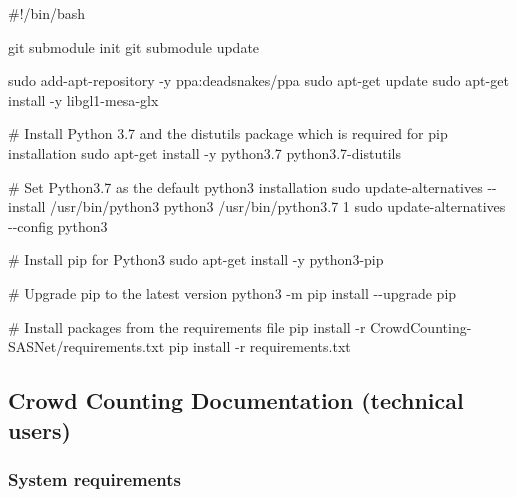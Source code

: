 \documentclass[
]{article}
\newenvironment{Shaded}{\begin{snugshade}}{\end{snugshade}}
\newcommand{\AttributeTok}[1]{\textcolor[rgb]{0.40,0.45,0.13}{#1}}
\newcommand{\CommentTok}[1]{\textcolor[rgb]{0.37,0.37,0.37}{#1}}
\newcommand{\ExtensionTok}[1]{\textcolor[rgb]{0.00,0.23,0.31}{#1}}
\newcommand{\FunctionTok}[1]{\textcolor[rgb]{0.28,0.35,0.67}{#1}}
\newcommand{\NormalTok}[1]{\textcolor[rgb]{0.00,0.23,0.31}{#1}}
\begin{document}
\begin{Shaded}
\begin{Highlighting}[]

\CommentTok{\#!/bin/bash}

\FunctionTok{git}\NormalTok{ submodule init}
\FunctionTok{git}\NormalTok{ submodule update}

\FunctionTok{sudo}\NormalTok{ add{-}apt{-}repository }\AttributeTok{{-}y}\NormalTok{ ppa:deadsnakes/ppa   }
\FunctionTok{sudo}\NormalTok{ apt{-}get update}
\FunctionTok{sudo}\NormalTok{ apt{-}get install }\AttributeTok{{-}y}\NormalTok{ libgl1{-}mesa{-}glx}

\CommentTok{\# Install Python 3.7 and the distutils package which is required for pip installation}
\FunctionTok{sudo}\NormalTok{ apt{-}get install }\AttributeTok{{-}y}\NormalTok{ python3.7 python3.7{-}distutils}

\CommentTok{\# Set Python3.7 as the default python3 installation}
\FunctionTok{sudo}\NormalTok{ update{-}alternatives }\AttributeTok{{-}{-}install}\NormalTok{ /usr/bin/python3 python3 /usr/bin/python3.7 1}
\FunctionTok{sudo}\NormalTok{ update{-}alternatives }\AttributeTok{{-}{-}config}\NormalTok{ python3}

\CommentTok{\# Install pip for Python3}
\FunctionTok{sudo}\NormalTok{ apt{-}get install }\AttributeTok{{-}y}\NormalTok{ python3{-}pip}

\CommentTok{\# Upgrade pip to the latest version}
\ExtensionTok{python3} \AttributeTok{{-}m}\NormalTok{ pip install }\AttributeTok{{-}{-}upgrade}\NormalTok{ pip}

\CommentTok{\# Install packages from the requirements file}
\ExtensionTok{pip}\NormalTok{ install }\AttributeTok{{-}r}\NormalTok{ CrowdCounting{-}SASNet/requirements.txt}
\ExtensionTok{pip}\NormalTok{ install }\AttributeTok{{-}r}\NormalTok{ requirements.txt}
\end{Highlighting}
\end{Shaded}

\hypertarget{crowd-counting-documentation-technical-users}{%
\subsection*{Crowd Counting Documentation (technical
users)}\label{crowd-counting-documentation-technical-users}}

\hypertarget{system-requirements}{%
\subsubsection{System requirements}\label{system-requirements}}
\end{document}
